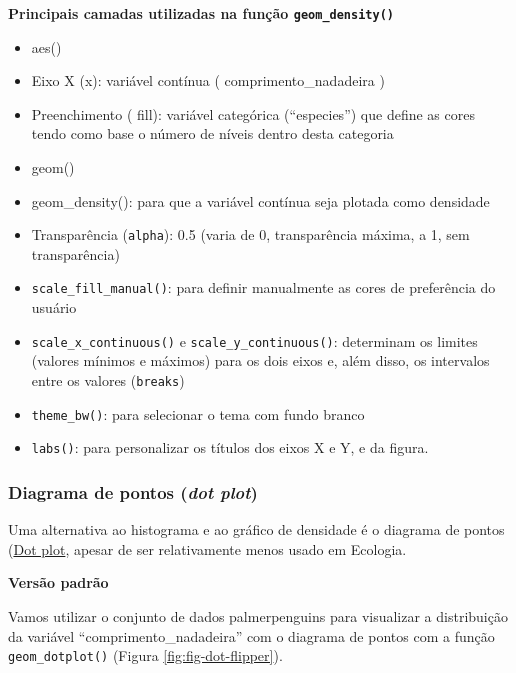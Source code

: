 \documentclass[
]{article}
\providecommand{\tightlist}{%
  \setlength{\itemsep}{0pt}\setlength{\parskip}{0pt}}
\begin{document}
\textbf{Principais camadas utilizadas na função \texttt{geom\_density()}}

\begin{itemize}
\tightlist
\item
  \colorbox[HTML]{dedede}{aes()}
\item
  Eixo X (\colorbox[HTML]{dedede}{x}): variável contínua ( \colorbox[HTML]{dedede}{comprimento\_nadadeira} )
\item
  Preenchimento ( \colorbox[HTML]{dedede}{fill}): variável categórica (``especies'') que define as cores tendo como base o número de níveis dentro desta categoria
\item
  \colorbox[HTML]{dedede}{geom()}
\item
  \colorbox[HTML]{dedede}{geom\_density()}: para que a variável contínua seja plotada como densidade
\item
  Transparência (\texttt{alpha}): 0.5 (varia de 0, transparência máxima, a 1, sem transparência)
\item
  \texttt{scale\_fill\_manual()}: para definir manualmente as cores de preferência do usuário
\item
  \texttt{scale\_x\_continuous()} e \texttt{scale\_y\_continuous()}: determinam os limites (valores mínimos e máximos) para os dois eixos e, além disso, os intervalos entre os valores (\texttt{breaks})
\item
  \texttt{theme\_bw()}: para selecionar o tema com fundo branco
\item
  \texttt{labs()}: para personalizar os títulos dos eixos X e Y, e da figura.
\end{itemize}

\hypertarget{diagrama-de-pontos-dot-plot}{%
\subsubsection{\texorpdfstring{Diagrama de pontos (\emph{dot plot})}{Diagrama de pontos (dot plot)}}\label{diagrama-de-pontos-dot-plot}}

Uma alternativa ao histograma e ao gráfico de densidade é o diagrama de pontos (\href{https://datavizproject.com/data-type/dot-plot/}{Dot plot}, apesar de ser relativamente menos usado em Ecologia.

\textbf{Versão padrão}

Vamos utilizar o conjunto de dados palmerpenguins para visualizar a distribuição da variável ``comprimento\_nadadeira'' com o diagrama de pontos com a função \texttt{geom\_dotplot()} (Figura \ref{fig:fig-dot-flipper}).
\end{document}
